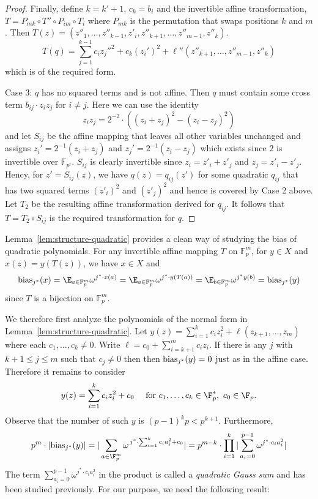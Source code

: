 \begin{proof}
\begin{sloppypar}
Finally, define $k=k'+1$, $c_k=b_i$ and
the invertible affine transformation,
$T=P_{mk}\circ T'' \circ P_{im}\circ T_i$ where
$P_{mk}$ is the permutation that swaps positions $k$ and $m$.  
Then $T(z)=(z''_1,\ldots,z''_{k-1},z'_i,z''_{k+1},\ldots,z''_{m-1},z''_{k})$.
$$T(q)=\sum_{j=1}^{k-1} c_i{z_{j}''}^2+c_k(z_i')^2+\ell''(z''_{k+1},\ldots,z''_{m-1},z''_k)$$
which is of the required form.
\end{sloppypar}

{\sc Case 3:} $q$ has no squared terms and is not affine.
Then $q$ must contain some cross term $b_{ij}\cdot z_iz_j$ for $i\ne j$.
Here we can use the identity
\[
z_iz_j=2^{-2}\cdot ((z_i+z_j)^2-(z_i-z_j)^2)
\]
and let $S_{ij}$ be the affine mapping that leaves all other variables unchanged
and assigns $z_i'=2^{-1}(z_i+z_j)$ and
$z_j'=2^{-1}(z_i-z_j)$ which exists since $2$ is invertible over $\mathbb{F}_{p^t}$.
$S_{ij}$ is clearly invertible since $z_i=z'_i+z'_j$ and $z_j=z'_i-z'_j$.
Hency, for $z'=S_{ij}(z)$, we have $q(z)=q_{ij}(z')$ for some quadratic
$q_{ij}$ that
has two squared terms $(z'_i)^2$ and $(z'_j)^2$ and hence is covered by Case 2
above.
Let $T_2$ be the resulting affine transformation derived for $q_{ij}$.
It follows that $T=T_2\circ S_{ij}$ is the required transformation for $q$.
\end{proof}

Lemma~\ref{lem:structure-quadratic} provides a clean way of studying the bias
of quadratic polynomials.
For any invertible affine mapping $T$ on $\mathbb{F}_p^m$, for $y\in X$
and $x(z)=y(T(z))$, we have $x\in X$ and
\begin{align*}
\biasjs(x)=\E_{a\in \mathbb{F}_p^{m}} \omega^{j^*\cdot x(a)}=\E_{a\in \mathbb{F}_p^{m}} \omega^{j^*\cdot y(T(a))}=\E_{b\in \mathbb{F}_p^m}\omega^{j^* y(b)}=\biasjs(y)
\end{align*}
since $T$ is a bijection on $\mathbb{F}_p^m$.

We therefore first analyze the polynomials of the normal form in
Lemma~\ref{lem:structure-quadratic}.
Let $y(z)=\sum_{i=1}^k c_iz_i^2+\ell(z_{k+1},\ldots, z_{m})$ where
each $c_1,\ldots,c_k \ne 0$.
Write $\ell=c_0+\sum_{i=k+1}^m c_iz_i$.
If there is any $j$ with $k+1\le j\le m$ such that $c_j\ne 0$ then
then $\mathrm{bias}_{j^*}(y)=0$ just as in the affine case.
Therefore it remains to consider 
\begin{equation}
y(z)=\sum_{i=1}^k c_iz_i^2+c_0\quad\mbox{ for }c_1,\ldots,c_k\in \F_p^*,\ c_0\in \F_p. \label{y-form}
\end{equation}
Observe that the number of such $y$ is $(p-1)^k p< p^{k+1}$.
Furthermore,
\begin{equation*}
p^m\cdot |\biasjs(y)|=|\sum_{a\in \F_p^m}\omega^{\,j^*\cdot \sum_{i=1}^k c_ia_i^2+c_0}|
=p^{m-k}\cdot\prod_{i=1}^k|\sum_{a_i=0}^{p-1}\omega^{j^*\cdot c_ia_i^2}|
\end{equation*}
The term $\sum_{a_i=0}^{p-1}\omega^{j^*\cdot c_ia_i^2}$ in the product
is called a \emph{quadratic Gauss sum} and has been studied previously.
For our purpose, we need the following result:

